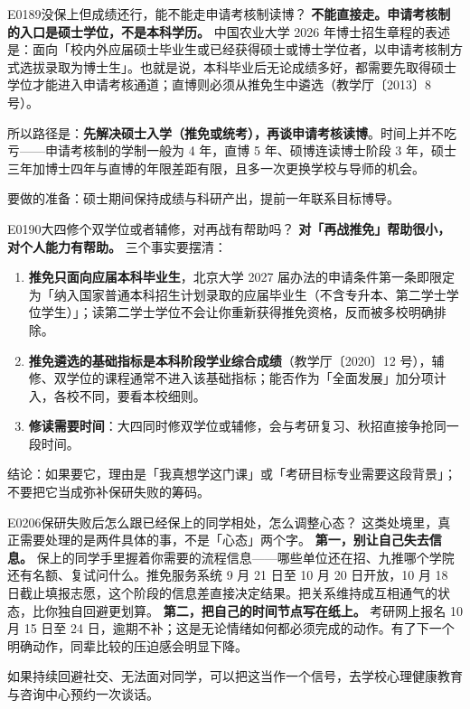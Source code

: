 \begin{qa}{E0189}{没保上但成绩还行，能不能走申请考核制读博？}
\textbf{不能直接走。申请考核制的入口是硕士学位，不是本科学历。}
中国农业大学 2026 年博士招生章程的表述是：面向「校内外应届硕士毕业生或已经获得硕士或博士学位者，以申请考核制方式选拔录取为博士生」。也就是说，本科毕业后无论成绩多好，都需要先取得硕士学位才能进入申请考核通道；直博则必须从推免生中遴选（教学厅〔2013〕8 号）。

所以路径是：\textbf{先解决硕士入学（推免或统考），再谈申请考核读博}。时间上并不吃亏——申请考核制的学制一般为 4 年，直博 5 年、硕博连读博士阶段 3 年，硕士三年加博士四年与直博的年限差距有限，且多一次更换学校与导师的机会。

要做的准备：硕士期间保持成绩与科研产出，提前一年联系目标博导。
\end{qa}

\begin{qa}{E0190}{大四修个双学位或者辅修，对再战有帮助吗？}
\textbf{对「再战推免」帮助很小，对个人能力有帮助。}
三个事实要摆清：
\begin{enumerate}
  \item \textbf{推免只面向应届本科毕业生}，北京大学 2027 届办法的申请条件第一条即限定为「纳入国家普通本科招生计划录取的应届毕业生（不含专升本、第二学士学位学生）」；读第二学士学位不会让你重新获得推免资格，反而被多校明确排除。
  \item \textbf{推免遴选的基础指标是本科阶段学业综合成绩}（教学厅〔2020〕12 号），辅修、双学位的课程通常不进入该基础指标；能否作为「全面发展」加分项计入，各校不同，要看本校细则。
  \item \textbf{修读需要时间}：大四同时修双学位或辅修，会与考研复习、秋招直接争抢同一段时间。
\end{enumerate}

结论：如果要它，理由是「我真想学这门课」或「考研目标专业需要这段背景」；不要把它当成弥补保研失败的筹码。
\end{qa}

\begin{qa}{E0206}{保研失败后怎么跟已经保上的同学相处，怎么调整心态？}
这类处境里，真正需要处理的是两件具体的事，不是「心态」两个字。
\textbf{第一，别让自己失去信息。} 保上的同学手里握着你需要的流程信息——哪些单位还在招、九推哪个学院还有名额、复试问什么。推免服务系统 9 月 21 日至 10 月 20 日开放，10 月 18 日截止填报志愿，这个阶段的信息差直接决定结果。把关系维持成互相通气的状态，比你独自回避更划算。
\textbf{第二，把自己的时间节点写在纸上。} 考研网上报名 10 月 15 日至 24 日，逾期不补；这是无论情绪如何都必须完成的动作。有了下一个明确动作，同辈比较的压迫感会明显下降。

如果持续回避社交、无法面对同学，可以把这当作一个信号，去学校心理健康教育与咨询中心预约一次谈话。
\end{qa}

